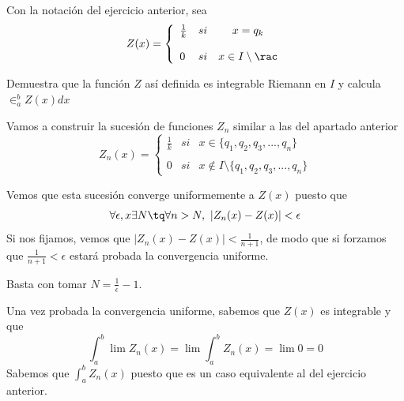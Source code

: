 \begin{problem}[4]
Con la notación del ejercicio anterior, sea
\[Z(x)= \left\{ \begin{array}{lcc}
             \frac{1}{k} &   si  & x = q_k \\
             \\ 0 &  si  & x \in I \setminus \rac
             \end{array}
   \right.\]

Demuestra que la función $Z$ así definida es integrable Riemann en $I$ y calcula $\in_a^bZ(x)dx$

\solution

Vamos a construir la sucesión de funciones $Z_n$ similar a las del apartado anterior
\[Z_n(x)= \left\{ \begin{array}{lcc}
             \frac{1}{k} &   si  & x \in \{q_1,q_2,q_3,...,q_n\} \\
             \\ 0 &  si  & x \notin I \setminus \{q_1,q_2,q_3,...,q_n\}
             \end{array}
   \right.\]

Vemos que esta sucesión converge uniformemente a $Z(x)$ puesto que
\[\forall \epsilon, x \exists N  \tq \forall n > N, \ |Z_n(x)-Z(x)|<\epsilon\]
Si nos fijamos, vemos que $|Z_n(x)-Z(x)|<\frac{1}{n+1}$, de modo que si forzamos que $\frac{1}{n+1}<\epsilon$ estará probada la convergencia uniforme.

Basta con tomar $N=\frac{1}{\epsilon} -1$.

Una vez probada la convergencia uniforme, sabemos que $Z(x)$ es integrable y que
\[\int_a^b \lim Z_n(x) =\lim \int_a^b Z_n(x) = \lim 0 = 0\]
Sabemos que $\int_a^b Z_n(x)$ puesto que es un caso equivalente al del ejercicio anterior.
\end{problem}

